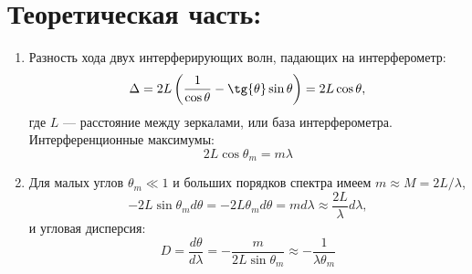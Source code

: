 \section*{Теоретическая часть:}
\begin{enumerate}
    \begin{figure}[h!]
        \noindent{}
        \caption{Амплитуды волн в интерферометре Фабри–Перо. Для прошедших волн также указаны набеги фаз}
    \end{figure}
    \item Разность хода двух интерферирующих волн,
падающих на интерферометр:
\[\Delta = 2L\left( \frac{1}{\cos{\theta}} - \tg{\theta} \sin{\theta} \right) = 2L \cos{\theta}, \]
    где $L$ --- расстояние между зеркалами, или база интерферометра. Интерференционные максимумы:
    \[ 2L \cos{\theta_m} = m \lambda \]
    
    \item Для малых углов $\theta_m \ll 1$ и больших порядков спектра имеем $m \approx M = 2L/\lambda$,
    \[ -2L \sin{\theta_m} d\theta = -2L\theta_m d\theta = m d\lambda \approx \frac{2L}{\lambda}d\lambda, \]
    и угловая дисперсия:
    \[ D = \frac{d\theta}{d\lambda} = -\frac{m}{2L \sin{\theta_m}} \approx -\frac{1}{\lambda\theta_m} \]


\end{enumerate}
